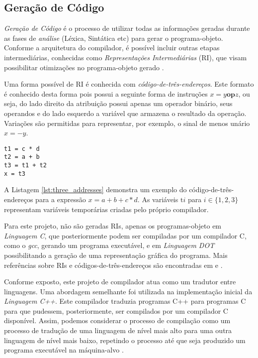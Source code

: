 \subsection{Geração de Código}
\emph{Geração de Código} é o processo de utilizar todas as informações
geradas durante as fases de \emph{análise} (Léxica, Sintática etc) para
gerar o programa-objeto. Conforme a arquitetura do compilador, é possível
incluir outras etapas intermediárias, conhecidas como \emph{Representações
Intermediárias} (RI), que visam possibilitar otimizações no programa-objeto
gerado \cite{louden97-pt}.

Uma forma possível de RI é conhecida com \emph{código-de-três-endereços}. Este
formato é conhecido desta forma pois possui a seguinte forma de instruções $x
= y \textbf{op} z$, ou seja, do lado direito da atribuição possui apenas um
operador binário, seus operandos e do lado esquerdo a variável que armazena o
resultado da operação. Variações são permitidas para representar, por exemplo,
o sinal de menos unário $x = -y$.

\begin{lstlisting}[label=lst:three_addresses,caption=Código de 3 Endereços]
t1 = c * d
t2 = a + b
t3 = t1 + t2
x = t3
\end{lstlisting}

A Listagem \ref{lst:three_addresses} demonstra um exemplo do
código-de-três-endereços para a expressão $x=a+b+c*d$. As variáveis
$\text{t}i$ para $i \in \{1,2,3\}$ representam variáveis temporárias criadas pelo próprio
compilador.

Para este projeto, não são geradas RIs, apenas os programas-objeto em
\emph{Linguagem C}, que posteriormente podem ser compiladas por um compilador
C, como o \emph{gcc}, gerando um programa executável, e em \emph{Linguagem
DOT} possibilitando a geração de uma representação gráfica do programa.
Mais referências sobre RIs e códigos-de-três-endereços são encontradas em
 e .

Conforme exposto, este projeto de compilador atua como um tradutor entre
linguagens. Uma abordagem semelhante foi utilizada na implementação inicial da
\emph{Linguagem C++}. Este compilador traduzia programas C++ para programas C
para que pudessem, posteriormente, ser compilados por um compilador C
disponível. Assim, podemos considerar o processo de compilação como um
processo de tradução de uma linguagem de nível mais alto para uma outra
linguagem de nível mais baixo, repetindo o  processo até que seja produzido um
programa executável na máquina-alvo \cite{new-dragon-pt}.

